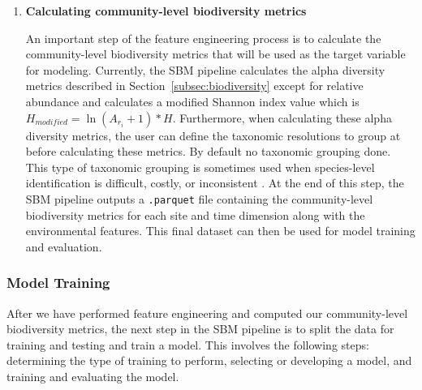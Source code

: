 \begin{enumerate}
\item \textbf{Calculating community-level biodiversity metrics}

An important step of the feature engineering process is to calculate the community-level biodiversity metrics that will be used as the target variable for modeling. Currently, the SBM pipeline calculates the alpha diversity metrics described in Section~\ref{subsec:biodiversity} except for relative abundance and calculates a modified Shannon index value which is \(H_{modified} = \ln(A_{r_{i}} + 1) * H\). Furthermore, when calculating these alpha diversity metrics, the user can define the taxonomic resolutions to group at before calculating these metrics. By default no taxonomic grouping done. This type of taxonomic grouping is sometimes used when species-level identification is difficult, costly, or inconsistent \parencite{de_oliveira_higher_2020}. At the end of this step, the SBM pipeline outputs a \texttt{.parquet} file containing the community-level biodiversity metrics for each site and time dimension along with the environmental features. This final dataset can then be used for model training and evaluation.
\end{enumerate}


\subsubsection{Model Training}\label{subsubsec:model_training}

After we have performed feature engineering and computed our community-level biodiversity metrics, the next step in the SBM pipeline is to split the data for training and testing and train a model. This involves the following steps: determining the type of training to perform, selecting or developing a model, and training and evaluating the model.

